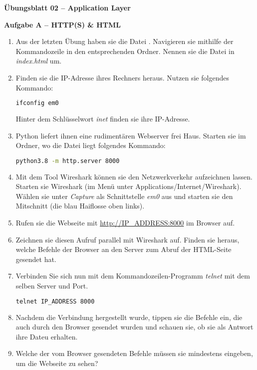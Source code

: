 \documentclass[paper=a4,fontsize=11pt]{scrartcl}%
\numberwithin{equation}{section}
\begin{document}
\begin{center}
\Large{\textbf{Übungsblatt 02 --  Application Layer}}
\end{center}

\begin{center}\Large{\textbf{Aufgabe A -- HTTP(S) \& HTML}}\end{center}\vskip0.25in
\begin{enumerate}
	\item Aus der letzten Übung haben sie die Datei . Navigieren sie mithilfe der Kommandozeile in den entsprechenden Ordner. Nennen sie die Datei in \emph{index.html} um.
	\item Finden sie die IP-Adresse ihres Rechners heraus. Nutzen sie folgendes Kommando:
		\begin{lstlisting}[style=Bash, language=Bash]
ifconfig em0
\end{lstlisting}
		Hinter dem Schlüsselwort \emph{inet} finden sie ihre IP-Adresse.
	\item Python liefert ihnen eine rudimentären Webserver frei Haus. Starten sie im Ordner, wo die  Datei liegt folgendes Kommando:
		\begin{lstlisting}[style=Bash, language=Bash]
python3.8 -m http.server 8000
		\end{lstlisting}
	\item Mit dem Tool Wireshark können sie den Netzwerkverkehr aufzeichnen lassen. Starten sie Wireshark (im Menü unter Applications/Internet/Wireshark). Wählen sie unter \emph{Capture} als Schnittstelle \emph{em0} aus und starten sie den Mitschnitt (die blau Haiflosse oben links).
	\item Rufen sie die Webseite mit \url{http://IP_ADDRESS:8000} im Browser auf.
	\item Zeichnen sie diesen Aufruf parallel mit Wireshark auf. Finden sie heraus, welche Befehle der Browser an den Server zum  Abruf der HTML-Seite gesendet hat.
	\item Verbinden Sie sich nun mit dem Kommandozeilen-Programm \emph{telnet} mit dem selben Server und Port.	
	\begin{lstlisting}[style=Bash, language=Bash]
telnet IP_ADDRESS 8000
\end{lstlisting}
	\item Nachdem die Verbindung hergestellt wurde, tippen sie die Befehle ein, die auch durch den Browser gesendet wurden und schauen sie, ob sie als Antwort ihre  Dateu erhalten.
	\item Welche der vom Browser gesendeten Befehle müssen sie mindestens eingeben, um die Webseite zu sehen?

\end{enumerate}
\end{document}
